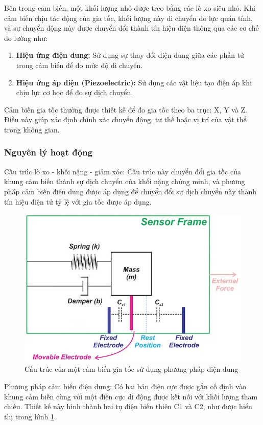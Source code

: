\indent Bên trong cảm biến, một khối lượng nhỏ được treo bằng các lò xo siêu nhỏ. Khi cảm biến chịu tác động của gia tốc, khối lượng này di chuyển do lực quán tính, và sự chuyển động này được chuyển đổi thành tín hiệu điện thông qua các cơ chế đo lường như:
\begin{enumerate}[-]
    \item \textbf{Hiệu ứng điện dung:} Sử dụng sự thay đổi điện dung giữa các phần tử trong cảm biến để đo mức độ di chuyển.
    \item \textbf{Hiệu ứng áp điện (Piezoelectric):} Sử dụng các vật liệu tạo điện áp khi chịu lực cơ học để đo sự dịch chuyển.
\end{enumerate}
\indent Cảm biến gia tốc thường được thiết kế để đo gia tốc theo ba trục: X, Y và Z. Điều này giúp xác định chính xác chuyển động, tư thế hoặc vị trí của vật thể trong không gian.

\subsubsection{Nguyên lý hoạt động}
\indent Cấu trúc lò xo - khối nặng - giảm xóc: Cấu trúc này chuyển đổi gia tốc của khung cảm biến thành sự dịch chuyển của khối nặng chứng minh, và phương pháp cảm biến điện dung được áp dụng để chuyển đổi sự dịch chuyển này thành tín hiệu điện tử tỷ lệ với gia tốc được áp dụng.
\begin{figure}[H]
    \centering
    \includegraphics[width=\textwidth,height=\textheight,keepaspectratio]{Images/Theoretical basis/168_Introduction_to_Capacitive_Acceleration_Sensors_Figure_3.jpeg}
    \caption{Cấu trúc của một cảm biến gia tốc sử dụng phương pháp điện dung}
    \label{fig:capacitive_sensor}
\end{figure}
\indent Phương pháp cảm biến điện dung: Có hai bản điện cực được gắn cố định vào khung cảm biến cùng với một điện cực di động được kết nối với khối lượng tham chiếu. Thiết kế này hình thành hai tụ điện biến thiên C1 và C2, như được hiển thị trong hình \ref{fig:capacitive_sensor}.

